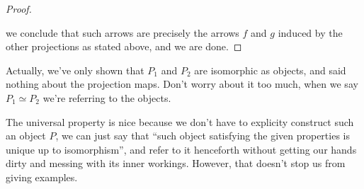 \begin{proof}
\begin{figure}[H]
\centering
{}
\end{figure}
we conclude that such arrows are precisely the arrows $f$ and $g$ induced by the other projections as stated above, and we are done.
\end{proof}
\begin{note}
    Actually, we've only shown that $P_1$ and $P_2$ are isomorphic as objects, and said nothing about the projection maps. Don't worry about it too much, when we say $P_1\simeq P_2$ we're referring to the objects.
\end{note}
The universal property is nice because we don't have to explicity construct such an object $P$, we can just say that ``such object satisfying the given properties is unique up to isomorphism'', and refer to it henceforth without getting our hands dirty and messing with its inner workings. However, that doesn't stop us from giving examples.
